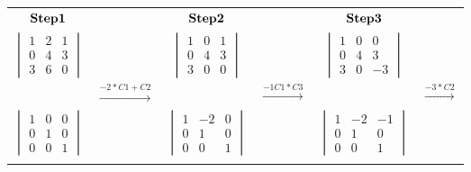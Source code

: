 \documentclass[]{article}
\begin{document}
\begin{tabular}{ c c c c c c }
$\bold{Step 1}$ &  & $\bold{Step 2}$  &  & $\bold{Step 3}$ \\
$\begin{vmatrix} 1 & 2 & 1\\ 0 & 4 & 3 \\ 3 & 6 & 0 \end{vmatrix}$ &  & $\begin{vmatrix} 1 & 0 & 1\\ 0 & 4 & 3 \\ 3 & 0 & 0 \end{vmatrix}$ &  & $\begin{vmatrix} 1 & 0 & 0\\ 0 & 4 & 3 \\ 3 & 0 & -3 \end{vmatrix}$ \\  
 & $\xrightarrow{-2*C1 + C2}$ &  & $\xrightarrow{-1C1*C3}$ & & $\xrightarrow{-3*C2}$\\
$\begin{vmatrix} 1 &   0 &   0\\ 0 &   1 &   0 \\ 0 &   0 &   1 \end{vmatrix}$ &  & $\begin{vmatrix} 1 &   -2 &   0\\ 0 &   1 &   0 \\ 0 &   0 &   1 \end{vmatrix}$ &  & $\begin{vmatrix} 1 &   -2 &   -1\\ 0 &   1 &   0 \\ 0 &   0 &   1 \end{vmatrix}$\\
 &  &  \\
\end{tabular}

\endgroup

\hspace{3cm}

\begingroup
\end{document}
